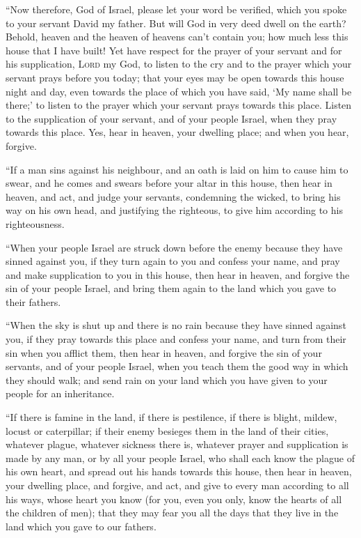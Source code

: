  ``Now therefore, God of Israel, please let your word be
verified, which you spoke to your servant David my father.
 But will God in very deed dwell on the earth? Behold,
heaven and the heaven of heavens can't contain you; how much less this
house that I have built!  Yet have respect for the prayer
of your servant and for his supplication, \textsc{Lord} my God, to
listen to the cry and to the prayer which your servant prays before you
today;  that your eyes may be open towards this house
night and day, even towards the place of which you have said, `My name
shall be there;' to listen to the prayer which your servant prays
towards this place.  Listen to the supplication of your
servant, and of your people Israel, when they pray towards this place.
Yes, hear in heaven, your dwelling place; and when you hear, forgive.

 ``If a man sins against his neighbour, and an oath is
laid on him to cause him to swear, and he comes and swears before your
altar in this house,  then hear in heaven, and act, and
judge your servants, condemning the wicked, to bring his way on his own
head, and justifying the righteous, to give him according to his
righteousness.

 ``When your people Israel are struck down before the
enemy because they have sinned against you, if they turn again to you
and confess your name, and pray and make supplication to you in this
house,  then hear in heaven, and forgive the sin of your
people Israel, and bring them again to the land which you gave to their
fathers.

 ``When the sky is shut up and there is no rain because
they have sinned against you, if they pray towards this place and
confess your name, and turn from their sin when you afflict them,
 then hear in heaven, and forgive the sin of your
servants, and of your people Israel, when you teach them the good way in
which they should walk; and send rain on your land which you have given
to your people for an inheritance.

 ``If there is famine in the land, if there is
pestilence, if there is blight, mildew, locust or caterpillar; if their
enemy besieges them in the land of their cities, whatever plague,
whatever sickness there is,  whatever prayer and
supplication is made by any man, or by all your people Israel, who shall
each know the plague of his own heart, and spread out his hands towards
this house,  then hear in heaven, your dwelling place,
and forgive, and act, and give to every man according to all his ways,
whose heart you know (for you, even you only, know the hearts of all the
children of men);  that they may fear you all the days
that they live in the land which you gave to our fathers.


